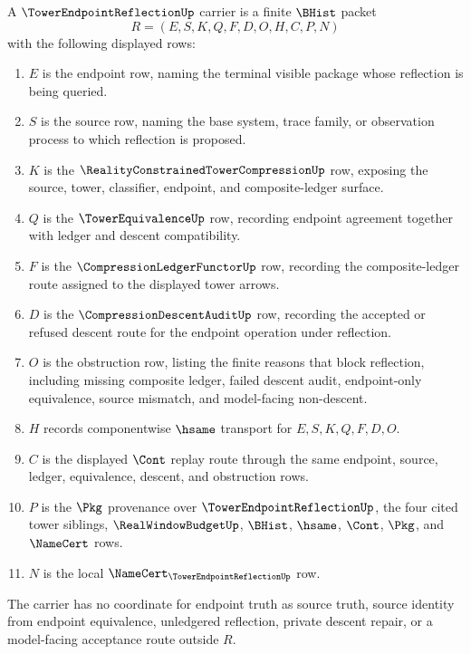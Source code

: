 \begin{definition}
\label{def:tower-endpoint-reflection-carrier}
A $\TowerEndpointReflectionUp$ carrier is a finite $\BHist$ packet
$$
R=(E,S,K,Q,F,D,O,H,C,P,N)
$$
with the following displayed rows:
\begin{enumerate}
\item $E$ is the endpoint row, naming the terminal visible package whose reflection is being queried.
\item $S$ is the source row, naming the base system, trace family, or observation process to which reflection is proposed.
\item $K$ is the $\RealityConstrainedTowerCompressionUp$ row, exposing the source, tower, classifier, endpoint, and composite-ledger surface.
\item $Q$ is the $\TowerEquivalenceUp$ row, recording endpoint agreement together with ledger and descent compatibility.
\item $F$ is the $\CompressionLedgerFunctorUp$ row, recording the composite-ledger route assigned to the displayed tower arrows.
\item $D$ is the $\CompressionDescentAuditUp$ row, recording the accepted or refused descent route for the endpoint operation under reflection.
\item $O$ is the obstruction row, listing the finite reasons that block reflection, including missing composite ledger, failed descent audit, endpoint-only equivalence, source mismatch, and model-facing non-descent.
\item $H$ records componentwise $\hsame$ transport for $E,S,K,Q,F,D,O$.
\item $C$ is the displayed $\Cont$ replay route through the same endpoint, source, ledger, equivalence, descent, and obstruction rows.
\item $P$ is the $\Pkg$ provenance over $\TowerEndpointReflectionUp$, the four cited tower siblings, $\RealWindowBudgetUp$, $\BHist$, $\hsame$, $\Cont$, $\Pkg$, and $\NameCert$ rows.
\item $N$ is the local $\NameCert_{\TowerEndpointReflectionUp}$ row.
\end{enumerate}
The carrier has no coordinate for endpoint truth as source truth, source identity from endpoint equivalence, unledgered reflection, private descent repair, or a model-facing acceptance route outside $R$.
\end{definition}


